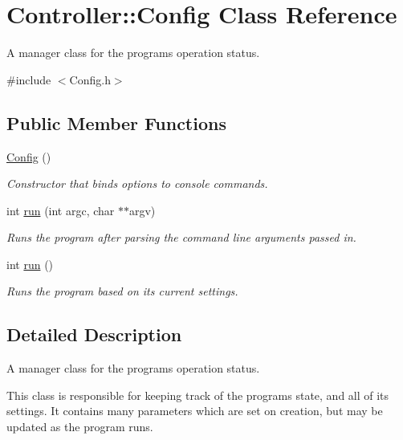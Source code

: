 \hypertarget{classController_1_1Config}{}\section{Controller\+::Config Class Reference}
\label{classController_1_1Config}


A manager class for the program\textquotesingle{}s operation status.  




{\ttfamily \#include $<$Config.\+h$>$}

\subsection*{Public Member Functions}
\begin{DoxyCompactItemize}
\item 
\mbox{\label{classController_1_1Config_ac7daa7cd9a6542b2607c1f491c9adc58}} 
\mbox{\hyperlink{classController_1_1Config_ac7daa7cd9a6542b2607c1f491c9adc58}{Config}} ()
\begin{DoxyCompactList}\small\item\em Constructor that binds options to console commands. \end{DoxyCompactList}\item 
int \mbox{\hyperlink{classController_1_1Config_ac37d92603bcd7a4f27e64b92a9cff1c0}{run}} (int argc, char $\ast$$\ast$argv)
\begin{DoxyCompactList}\small\item\em Runs the program after parsing the command line arguments passed in. \end{DoxyCompactList}\item 
int \mbox{\hyperlink{classController_1_1Config_adcbaa24721e3f3db508c93301b75a49c}{run}} ()
\begin{DoxyCompactList}\small\item\em Runs the program based on its current settings. \end{DoxyCompactList}\end{DoxyCompactItemize}


\subsection{Detailed Description}
A manager class for the program\textquotesingle{}s operation status. 

This class is responsible for keeping track of the program\textquotesingle{}s state, and all of its settings. It contains many parameters which are set on creation, but may be updated as the program runs. 

